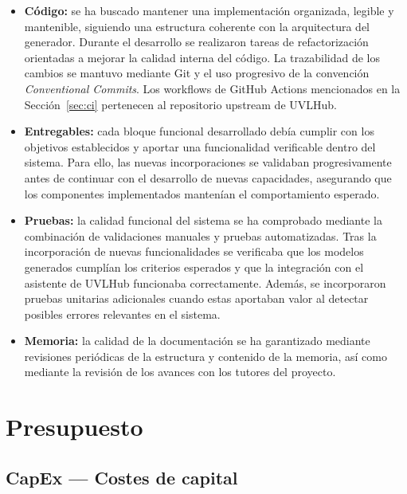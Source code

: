 \begin{itemize}

\item \textbf{Código:} se ha buscado mantener una implementación organizada,
legible y mantenible, siguiendo una estructura coherente con la arquitectura
del generador. Durante el desarrollo se realizaron tareas de refactorización
orientadas a mejorar la calidad interna del código. La trazabilidad de los
cambios se mantuvo mediante Git y el uso progresivo de la convención
\textit{Conventional Commits}. Los workflows de GitHub Actions mencionados en
la Sección~\ref{sec:ci} pertenecen al repositorio upstream de UVLHub.

\item \textbf{Entregables:} cada bloque funcional desarrollado debía cumplir con los objetivos establecidos y aportar una funcionalidad verificable dentro del sistema. Para ello, las nuevas incorporaciones se validaban progresivamente antes de continuar con el desarrollo de nuevas capacidades, asegurando que los componentes implementados mantenían el comportamiento esperado.

\item \textbf{Pruebas:} la calidad funcional del sistema se ha comprobado mediante la combinación de validaciones manuales y pruebas automatizadas. Tras la incorporación de nuevas funcionalidades se verificaba que los modelos generados cumplían los criterios esperados y que la integración con el asistente de UVLHub funcionaba correctamente. Además, se incorporaron pruebas unitarias adicionales cuando estas aportaban valor al detectar posibles errores relevantes en el sistema.

\item \textbf{Memoria:} la calidad de la documentación se ha garantizado mediante revisiones periódicas de la estructura y contenido de la memoria, así como mediante la revisión de los avances con los tutores del proyecto.

\end{itemize}

\section{Presupuesto}
\label{sec:presupuesto}



\subsection*{CapEx --- Costes de capital}

